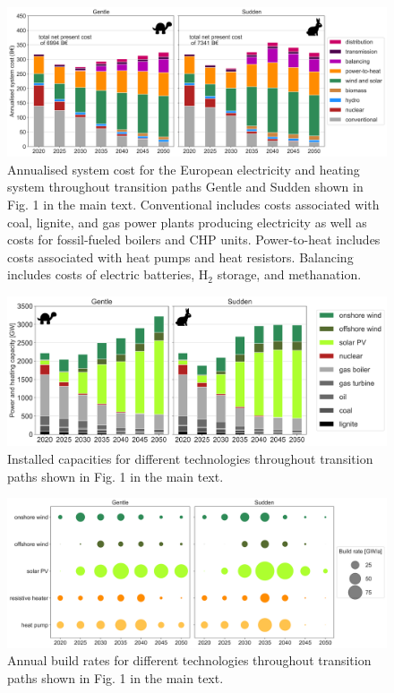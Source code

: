 \documentclass[3p]{elsarticle} %
\begin{document}
\begin{figure}[!h]
	\centering
	\includegraphics[width=\columnwidth]{../figures/System_cost_Base.png}
	\caption{Annualised system cost for the European electricity and heating system throughout transition paths Gentle and Sudden shown in Fig. 1 in the main text. Conventional includes costs associated with coal, lignite, and gas power plants producing electricity as well as costs for fossil-fueled boilers and CHP units. Power-to-heat includes costs associated with heat pumps and heat resistors. Balancing includes costs of electric batteries, H$_2$ storage, and methanation. } \label{fig_system_cost} 
\end{figure}


\begin{figure}[!h]
	\centering
	\includegraphics[width=\columnwidth]{../figures/installed_capacity_Base.png}
	\caption{Installed capacities for different technologies throughout transition paths shown in Fig. 1 in the main text.} \label{fig_installed_capacity} 
\end{figure}

\begin{figure}[!h]
\centering
\includegraphics[width=\columnwidth]{../figures/build_rates_Base.png}
\caption{Annual build rates for different technologies throughout transition paths shown in Fig. 1 in the main text. } \label{fig_build_rates} 
\end{figure}
\end{document}
